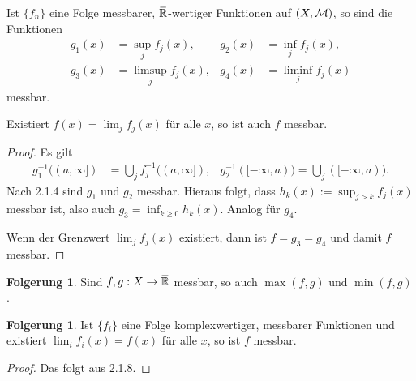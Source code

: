 \documentclass[
 a4paper,
 12pt,
 parskip=half
 ]{scrreprt}
\theoremstyle{plain}
\theoremstyle{definition}
\newtheorem{folg}[thm]{Folgerung}
\numberwithin{equation}{section}
\begin{document}
\begin{lem}
 Ist $\{f_n\}$ eine Folge messbarer, $\realext$-wertiger Funktionen auf $(X, \mathcal{M})$, so sind die Funktionen 
 \begin{align*}
  g_1(x) &= \sup_j f_j(x), & g_2(x) &= \inf_j f_j(x), \\
  g_3(x) &= \limsup_{j} f_j(x), & g_4(x) &= \liminf_j f_j(x)
 \end{align*}
 messbar.
 
 Existiert $f(x) = \lim_j f_j(x)$ für alle $x$, so ist auch $f$ messbar.
\end{lem}

\begin{proof}
 Es gilt
 \begin{align*}
   g_1^{-1}( (a, \infty] ) &= \bigcup_{j} f_j^{-1} ((a,\infty]), & g_2^{-1}([-\infty,a)) = \bigcup_j ([-\infty,a)).
 \end{align*}
 Nach 2.1.4 sind $g_1$ und $g_2$ messbar. Hieraus folgt, dass $h_k(x) := \sup_{j > k} f_j(x)$ messbar ist, also auch $g_3 = \inf_{k \ge 0} h_k(x)$. Analog für $g_4$.
 
 Wenn der Grenzwert $\lim_j f_j(x)$ existiert, dann ist $f = g_3 = g_4$ und damit $f$ messbar.
\end{proof}

\begin{folg}
 Sind $f,g : X \to \realext$ messbar, so auch $\max(f,g)$ und $\min(f,g)$.
\end{folg}

\begin{folg}
 Ist $\{f_i\}$ eine Folge komplexwertiger, messbarer Funktionen und existiert $\lim_i f_i(x) = f(x)$ für alle $x$, so ist $f$ messbar.
\end{folg}

\begin{proof}
 Das folgt aus 2.1.8.
\end{proof}
\end{document}
